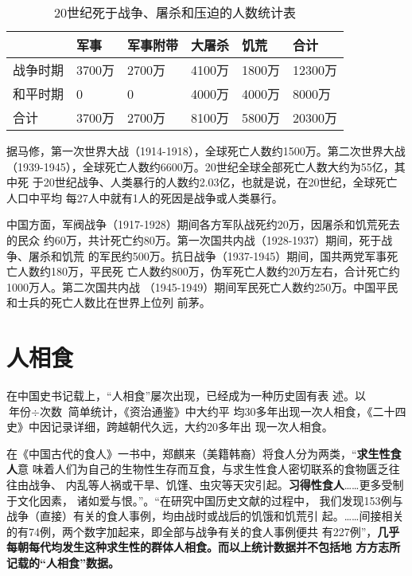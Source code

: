 \begin{table}[h]
  \centering
  \begin{tabular}{@{}llllll@{}}
    \toprule & 军事 & 军事附带 & 大屠杀 & 饥荒 & 合计 \\ \midrule
    战争时期 & 3700万 & 2700万 & 4100万 & 1800万 & 12300万 \\
    和平时期 & 0 & 0 & 4000万 & 4000万 & 8000万 \\
    合计 & 3700万 & 2700万 & 8100万 & 5800万 & 20300万 \\ \bottomrule
  \end{tabular}
  \caption{20世纪死于战争、屠杀和压迫的人数统计表}
  \label{tab:20stdied}
\end{table}

据马修，第一次世界大战（1914-1918），全球死亡人数约1500万。第二次世界大战
（1939-1945），全球死亡人数约6600万。20世纪全球全部死亡人数大约为55亿，其中死
于20世纪战争、人类暴行的人数约2.03亿，也就是说，在20世纪，全球死亡人口中平均
每27人中就有1人的死因是战争或人类暴行。

中国方面，军阀战争（1917-1928）期间各方军队战死约20万，因屠杀和饥荒死去的民众
约60万，共计死亡约80万。第一次国共内战（1928-1937）期间，死于战争、屠杀和饥荒
的军民约500万。抗日战争（1937-1945）期间，国共两党军事死亡人数约180万，平民死
亡人数约800万，伪军死亡人数约20万左右，合计死亡约1000万人。第二次国共内战
（1945-1949）期间军民死亡人数约250万。中国平民和士兵的死亡人数比在世界上位列
前茅。

\section{人相食}

在中国史书记载上，“人相食”屡次出现，已经成为一种历史固有表
述\cite{renxiangshi}。以 $ \mbox{年份} \div \mbox{次数} $ 简单统计，《资治通鉴》中大约平
均30多年出现一次人相食，《二十四史》中因记录详细，跨越朝代久远，大约20多年出
现一次人相食。

在《中国古代的食人》一书中，郑麒来（美籍韩裔）将食人分为两类，“\textbf{求生性食人}意
味着人们为自己的生物性生存而互食，与求生性食人密切联系的食物匮乏往往由战争、
内乱等人祸或干旱、饥馑、虫灾等天灾引起。\textbf{习得性食人}……更多受制于文化因素，
诸如爱与恨。”\cite[152]{9787500415480}。“在研究中国历史文献的过程中，
我们发现153例与战争（直接）有关的食人事例，均由战时或战后的饥饿和饥荒引
起。……间接相关的有74例，两个数字加起来，即全部与战争有关的食人事例便共
有227例”，\textbf{几乎每朝每代均发生这种求生性的群体人相食。而以上统计数据并不包括地
方方志所记载的“人相食”数据。}

